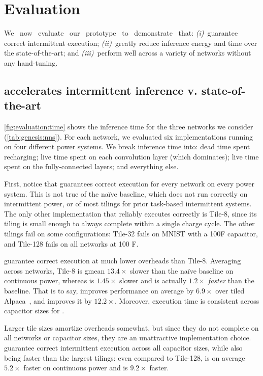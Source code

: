 \section{Evaluation}
\label{sonic:evaluation}

We ~now ~evaluate ~our ~prototype ~to ~demonstrate ~that:
%
\emph{(i)}~\sonictails guarantee correct intermittent execution;
%
\emph{(ii)}~\sonictails greatly reduce inference energy and time over
the state-of-the-art; and
%
\emph{(iii)}~\sonictails perform well across a variety of networks
without any hand-tuning.

\subsection{\sonictails accelerates intermittent inference 
v. state-of-the-art}

\autoref{fig:evaluation:time} shows the inference time for the three
networks we consider (\autoref{tab:genesis:nns}).
%
For each network, we evaluated six implementations running on four different power systems.
%
We break inference time into:
dead time spent recharging;
live time spent on each convolution layer (which dominates);
live time spent on the fully-connected layers;
and everything else.

First, notice that \sonictails guarantees correct execution for every
network on every power system.
%
This is not true of the na\"ive baseline, which does not run correctly
on intermittent power, or of most tilings for prior task-based
intermittent systems.
%
The only other implementation that reliably executes correctly is
Tile-8, since its tiling is small enough to always complete within a
single charge cycle.
%
The other tilings fail on some configurations: Tile-32 fails on
MNIST with a 100\textmu F capacitor, and Tile-128 fails on all networks at 100\textmu
F.

\sonictails guarantee correct execution at much lower
overheads than Tile-8.
%
Averaging across networks, Tile-8 is gmean $13.4\times$ slower than the
na\"ive baseline on continuous power, whereas \sonic is $1.45\times$ slower and 
\tails is actually $1.2\times$ \emph{faster} than the baseline.
%
That is to say, \sonic improves performance on average by $6.9\times$ over tiled Alpaca~\cite{alpaca},
and \tails improves it by $12.2\times$.
%
Moreover, execution time is consistent across capacitor sizes for \sonictails.

\figSONICEvalOther

Larger tile sizes amortize overheads somewhat, but since they do not
complete on all networks or capacitor sizes, they are an unattractive
implementation choice.
%
\sonictails guarantee correct intermittent execution across all capacitor
sizes, while also being faster than the largest tilings: even compared
to Tile-128, \sonic is on average $5.2\times$ faster on continuous power and \tails
is $9.2\times$ faster.

